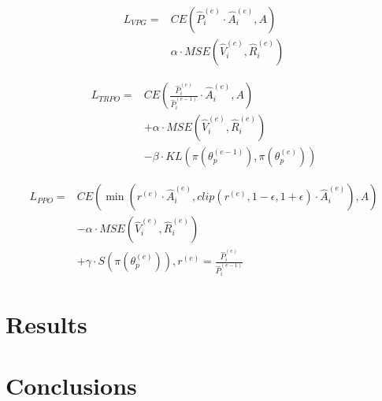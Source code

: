 \documentclass{article}
\begin{document}
\begin{equation}
  \begin{aligned}
    L_{VPG}={} & CE(\hat{P}_i^{(e)}\cdot \hat{A}_i^{(e)}, A) \\
    & \alpha\cdot MSE(\hat{V}_i^{(e)}, \hat{R}_i^{(e)})
  \end{aligned}
\end{equation}

\begin{equation}
  \begin{aligned}
    L_{TRPO}={} & CE(\frac{\hat{P}_i^{(e)}}{\hat{P}_i^{(e-1)}}\cdot \hat{A}_i^{(e)}, A) \\
    & + \alpha\cdot MSE(\hat{V}_i^{(e)}, \hat{R}_i^{(e)}) \\
    & - \beta\cdot KL(\pi(\theta_p^{(e-1)}), \pi(\theta_p^{(e)}))
  \end{aligned}
\end{equation}

\begin{equation}
  \begin{aligned}
    L_{PPO}={} & CE(\min(r^{(e)}\cdot \hat{A}_i^{(e)}, clip(r^{(e)}, 1-\epsilon, 1+\epsilon)\cdot \hat{A}_i^{(e)}), A) \\
    & - \alpha\cdot MSE(\hat{V}_i^{(e)}, \hat{R}_i^{(e)}) \\
    & + \gamma\cdot S(\pi(\theta_p^{(e)})), r^{(e)}=\frac{\hat{P}_i^{(e)}}{\hat{P}_i^{(e-1)}}
  \end{aligned}
\end{equation}

\section{Results}

\section{Conclusions}


\end{document}
